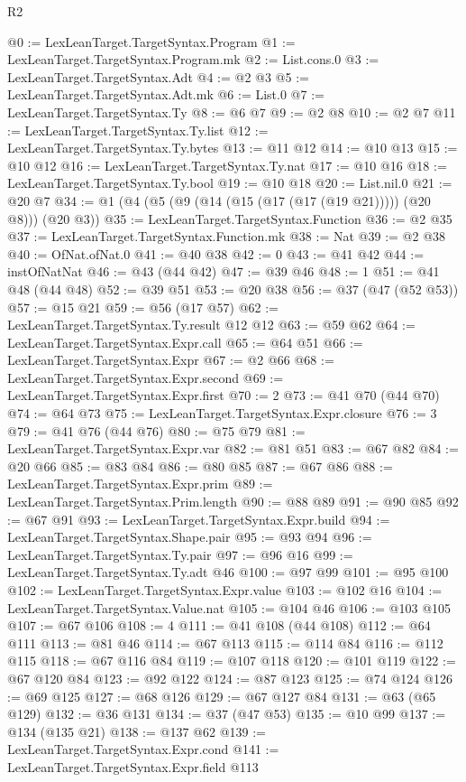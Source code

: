 \begin{lexlean}{R2}
\begin{coremodule}
@0 := LexLeanTarget.TargetSyntax.Program
@1 := LexLeanTarget.TargetSyntax.Program.mk
@2 := List.cons.{0}
@3 := LexLeanTarget.TargetSyntax.Adt
@4 := @2 @3
@5 := LexLeanTarget.TargetSyntax.Adt.mk
@6 := List.{0}
@7 := LexLeanTarget.TargetSyntax.Ty
@8 := @6 @7
@9 := @2 @8
@10 := @2 @7
@11 := LexLeanTarget.TargetSyntax.Ty.list
@12 := LexLeanTarget.TargetSyntax.Ty.bytes
@13 := @11 @12
@14 := @10 @13
@15 := @10 @12
@16 := LexLeanTarget.TargetSyntax.Ty.nat
@17 := @10 @16
@18 := LexLeanTarget.TargetSyntax.Ty.bool
@19 := @10 @18
@20 := List.nil.{0}
@21 := @20 @7
@34 := @1 (@4 (@5 (@9 (@14 (@15 (@17 (@17 (@19 @21))))) (@20 @8))) (@20 @3))
@35 := LexLeanTarget.TargetSyntax.Function
@36 := @2 @35
@37 := LexLeanTarget.TargetSyntax.Function.mk
@38 := Nat
@39 := @2 @38
@40 := OfNat.ofNat.{0}
@41 := @40 @38
@42 := 0
@43 := @41 @42
@44 := instOfNatNat
@46 := @43 (@44 @42)
@47 := @39 @46
@48 := 1
@51 := @41 @48 (@44 @48)
@52 := @39 @51
@53 := @20 @38
@56 := @37 (@47 (@52 @53))
@57 := @15 @21
@59 := @56 (@17 @57)
@62 := LexLeanTarget.TargetSyntax.Ty.result @12 @12
@63 := @59 @62
@64 := LexLeanTarget.TargetSyntax.Expr.call
@65 := @64 @51
@66 := LexLeanTarget.TargetSyntax.Expr
@67 := @2 @66
@68 := LexLeanTarget.TargetSyntax.Expr.second
@69 := LexLeanTarget.TargetSyntax.Expr.first
@70 := 2
@73 := @41 @70 (@44 @70)
@74 := @64 @73
@75 := LexLeanTarget.TargetSyntax.Expr.closure
@76 := 3
@79 := @41 @76 (@44 @76)
@80 := @75 @79
@81 := LexLeanTarget.TargetSyntax.Expr.var
@82 := @81 @51
@83 := @67 @82
@84 := @20 @66
@85 := @83 @84
@86 := @80 @85
@87 := @67 @86
@88 := LexLeanTarget.TargetSyntax.Expr.prim
@89 := LexLeanTarget.TargetSyntax.Prim.length
@90 := @88 @89
@91 := @90 @85
@92 := @67 @91
@93 := LexLeanTarget.TargetSyntax.Expr.build
@94 := LexLeanTarget.TargetSyntax.Shape.pair
@95 := @93 @94
@96 := LexLeanTarget.TargetSyntax.Ty.pair
@97 := @96 @16
@99 := LexLeanTarget.TargetSyntax.Ty.adt @46
@100 := @97 @99
@101 := @95 @100
@102 := LexLeanTarget.TargetSyntax.Expr.value
@103 := @102 @16
@104 := LexLeanTarget.TargetSyntax.Value.nat
@105 := @104 @46
@106 := @103 @105
@107 := @67 @106
@108 := 4
@111 := @41 @108 (@44 @108)
@112 := @64 @111
@113 := @81 @46
@114 := @67 @113
@115 := @114 @84
@116 := @112 @115
@118 := @67 @116 @84
@119 := @107 @118
@120 := @101 @119
@122 := @67 @120 @84
@123 := @92 @122
@124 := @87 @123
@125 := @74 @124
@126 := @69 @125
@127 := @68 @126
@129 := @67 @127 @84
@131 := @63 (@65 @129)
@132 := @36 @131
@134 := @37 (@47 @53)
@135 := @10 @99
@137 := @134 (@135 @21)
@138 := @137 @62
@139 := LexLeanTarget.TargetSyntax.Expr.cond
@141 := LexLeanTarget.TargetSyntax.Expr.field @113

\end{coremodule}
\end{lexlean}
